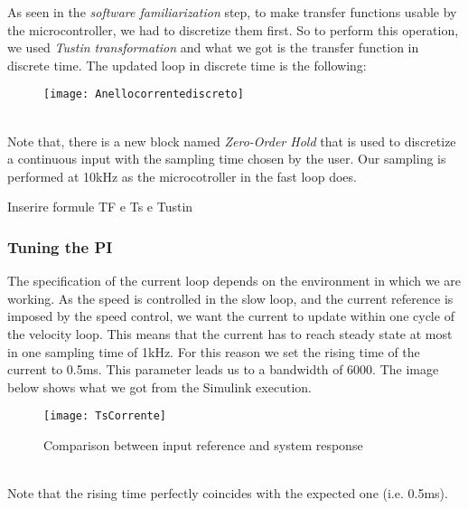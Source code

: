 \documentclass[12pt]{article}
\begin{document}
As seen in the \textit{software familiarization} step, to make transfer functions usable by the microcontroller, we had to discretize them first.
So to perform this operation, we used \textit{Tustin transformation} and what we got is the transfer function in discrete time.
The updated loop in discrete time is the following:
\begin{figure}[h]
\centering
\texttt{[image: Anellocorrentediscreto]}
\end{figure}\\
Note that, there is a new block named \textit{Zero-Order Hold} that is used to discretize a continuous input with the sampling time chosen by the user. Our sampling is performed at 10kHz as the microcotroller in the fast loop does.
\begin{huge}
Inserire formule TF e Ts e Tustin
\end{huge}
\subsubsection*{Tuning the PI}
The specification of the current loop depends on the environment in which we are working. As the speed is controlled in the slow loop, and the current reference is imposed by the speed control, we want the current to update within one cycle of the velocity loop. This means that the current has to reach steady state at most in one sampling time of 1kHz. For this reason we set the rising time of the current to 0.5ms. This parameter leads us to a bandwidth of 6000.
The image below shows what we got from the Simulink execution. 
\begin{figure}[h]
\centering
\texttt{[image: TsCorrente]}
\caption{Comparison between input reference and system response}
\end{figure}\\
Note that the rising time perfectly coincides with the expected one (i.e. 0.5ms). 
\end{document}
